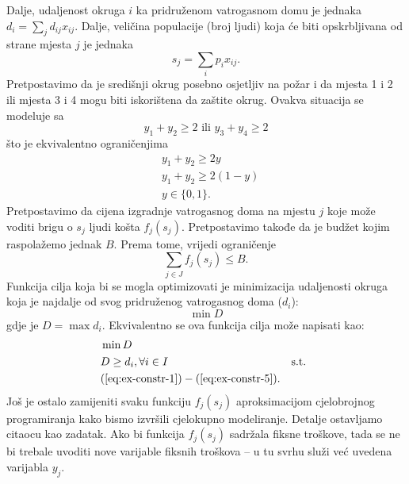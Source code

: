\documentclass[a4paper, utf8, 11pt, colorlinks]{book}
\begin{document}
Dalje, udaljenost okruga $i$ ka pridruženom vatrogasnom domu je jednaka $d_i = \sum_{j} d_{ij}x_{ij} $. Dalje, veličina populacije (broj ljudi) koja će biti opskrbljivana od strane mjesta $j$ je jednaka 
\begin{equation}\label{eq:ex-constr-3}
    s_j = \sum_{i} p_i x_{ij}. 
\end{equation}
Pretpostavimo da je središnji okrug posebno osjetljiv na požar i da  mjesta 1 i 2 ili mjesta 3 i 4 mogu biti iskorištena da zaštite okrug. Ovakva situacija se modeluje sa
\begin{equation*} 
    y_1 + y_2 \geq 2 \mbox{ ili } y_3 + y_4 \geq 2
\end{equation*}
što je ekvivalentno ograničenjima 
\begin{align}
    &y_1 + y_2 \geq 2 y \nonumber \\
    &y_1 + y_2 \geq 2 (1-y) \nonumber \\
    & y \in \{0, 1 \}.\label{eq:ex-constr-4}
\end{align}
Pretpostavimo da cijena izgradnje vatrogasnog doma na mjestu $j$ koje može voditi brigu o $s_j$ ljudi košta $f_j(s_j)$. Pretpostavimo takođe da je budžet kojim raspolažemo jednak $B$. Prema tome, vrijedi ograničenje
\begin{equation}\label{eq:ex-constr-5}
     \sum_{j \in J} f_j(s_j) \leq B.
\end{equation}
 Funkcija cilja koja bi se mogla optimizovati je minimizacija udaljenosti 
 okruga koja je najdalje od svog pridruženog vatrogasnog doma ($d_i$):
      $$\min D $$
 gdje je $D= \max d_i$. Ekvivalentno se ova funkcija cilja može napisati kao:
 \begin{align*}
      &\min D \\
      & D \geq d_i,  \forall i \in I
      & \mbox{s.t. } \\ &(\ref{eq:ex-constr-1})-(\ref{eq:ex-constr-5}).
 \end{align*}
 Još je ostalo zamijeniti svaku funkciju $f_j (s_j)$ aproksimacijom cjelobrojnog programiranja kako bismo izvršili cjelokupno modeliranje. Detalje ostavljamo citaocu kao zadatak. Ako bi funkcija $f_j (s_j)$ sadržala fiksne troškove, tada se ne bi trebale uvoditi nove varijable fiksnih troškova -- u tu svrhu služi već uvedena varijabla $y_j$. 
 
\end{document}

